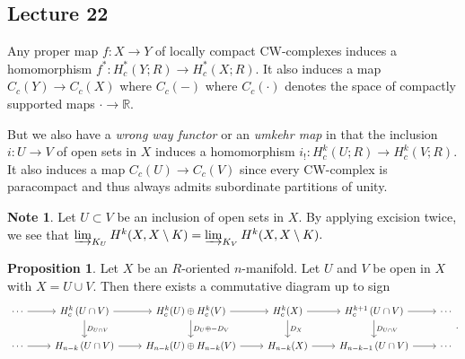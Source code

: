 \documentclass[10pt,letterpaper,cm]{nupset}
\theoremstyle{definition}
\newtheorem{note}[definition]{Note}
\theoremstyle{theorem}
\newtheorem{prop}[definition]{Proposition}
\theoremstyle{remark}
\newcommand{\R}{\mathbb{R}}
\newcommand{\1}{\mathbb{1}}
\newcommand{\0}{\vec 0}
\begin{document}
\subsection{Lecture 22}


Any  proper map $f: X \to Y$ of locally compact CW-complexes  induces  a homomorphism $f^{\ast}: H_c^{\ast}(Y; R) \to H_c^{\ast}(X; R)$. It also induces a map $C_c(Y) \to C_c(X)$ where $C_c({-})$ where $C_c({\cdot})$ denotes the space of compactly supported  maps ${\cdot} \to \R$.

But we also have a \textit{wrong way functor} or an \textit{umkehr map} in that the inclusion $i: U \to V$ of open sets in $X$ induces a homomorphism $i_{!} : H_c^k(U; R) \to H_c^k(V; R)$. It also induces a map $C_c(U) \to C_c(V)$ since every CW-complex is paracompact and thus always admits subordinate partitions of unity.


\begin{note}
Let $U \subset V$ be an inclusion of open sets in $X$. By applying excision twice, we see that $\varinjlim_{K_U} H^k(X, X \setminus K) = \varinjlim_{K_V} H^k(X, X \setminus K).$
\end{note}

\begin{prop}\label{p3}
Let $X$ be an $R$-oriented $n$-manifold.  Let $U$ and $V$ be open in $X$ with $X = U \cup V$. Then there exists a commutative diagram up to sign
\[
\begin{tikzcd}
\cdots \arrow[r] & H^k_c\left(U \cap V\right) \arrow[r] \arrow[d, "D_{U \cap V}"] & H_c^k(U)\oplus H_c^k(V) \arrow[r] \arrow[d, "D_U \oplus {-}D_V"] & H_c^k(X) \arrow[r] \arrow[d, "D_X"] & H^{k+1}_c\left(U \cap V\right) \arrow[d, "D_{U \cap V}"] \arrow[r] & \cdots \\
\cdots \arrow[r] & H_{n-k}\left(U \cap V\right) \arrow[r]                         & H_{n-k}(U) \oplus H_{n-k}(V) \arrow[r]                           & H_{n-k}(X) \arrow[r]                & H_{n-k-1}\left(U \cap V\right) \arrow[r]                         & \cdots
\end{tikzcd}
.\]
\end{prop}
\end{document}
